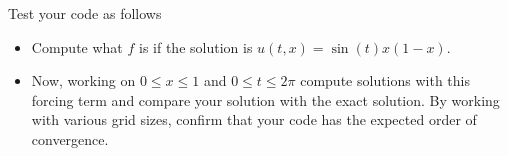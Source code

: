 \documentclass[minion]{homework}
\begin{document}
\begin{problems}
Test your code as follows

\begin{itemize}  
\item Compute what $f$ is if the solution is $u(t,x)=\sin(t)x(1-x)$.  
\item Now, working on $0\le x\le 1$ and $0\le t\le 2\pi$ 
compute solutions with this forcing term and compare your solution
with the exact solution.  By working with various grid sizes,
confirm that your code has the expected order of convergence.
\end{itemize}


\end{problems}
\end{document}
